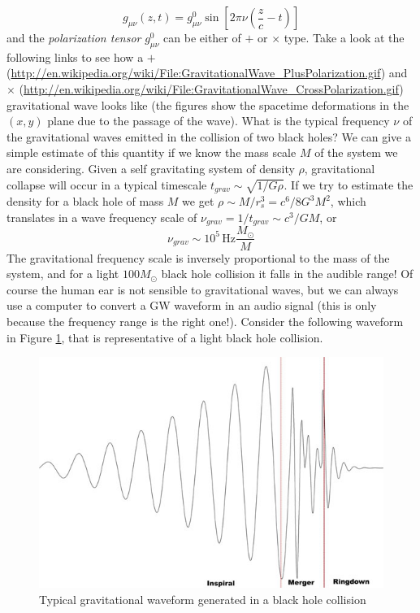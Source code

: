 \documentclass[11pt, a4paper,oneside,openright]{book}
\numberwithin{equation}{section}
\begin{document}
\begin{equation}
g_{\mu\nu}(z,t) = g^0_{\mu\nu}\sin{\left[2\pi\nu\left(\frac{z}{c}-t\right)\right]}
\end{equation}
and the \textit{polarization tensor} $g^0_{\mu\nu}$ can be either of $+$ or $\times$ type. Take a look at the following links to see how a $+$ (\url{http://en.wikipedia.org/wiki/File:GravitationalWave_PlusPolarization.gif}) and $\times$ (\url{http://en.wikipedia.org/wiki/File:GravitationalWave_CrossPolarization.gif}) gravitational wave looks like (the figures show the spacetime deformations in the $(x,y)$ plane due to the passage of the wave). What is the typical frequency $\nu$ of the gravitational waves emitted in the collision of two black holes? We can give a simple estimate of this quantity if we know the mass scale $M$ of the system we are considering. Given a self gravitating system of density $\rho$, gravitational collapse will occur in a typical timescale $t_{grav}\sim\sqrt{1/G\rho}$. If we try to estimate the density for a black hole of mass $M$ we get $\rho\sim M/r_s^3 = c^6/8G^3M^2$, which translates in a wave frequency scale of $\nu_{grav} = 1/t_{grav} \sim c^3/GM$, or
\begin{equation}
\nu_{grav}\sim 10^5\,\mathrm{Hz}\frac{M_\odot}{M}
\end{equation}   
The gravitational frequency scale is inversely proportional to the mass of the system, and for a light $100M_\odot$ black hole collision it falls in the audible range! Of course the human ear is not sensible to gravitational waves, but we can always use a computer to convert a GW waveform in an audio signal (this is only because the frequency range is the right one!). Consider the following waveform in Figure \ref{waveform}, that is representative of a light black hole collision. 
\begin{figure}
\begin{center}
\includegraphics[scale=0.5]{Draw/GWwaveform.jpg}
\end{center}
\caption{Typical gravitational waveform generated in a black hole collision}
\label{waveform}
\end{figure}
\end{document}
